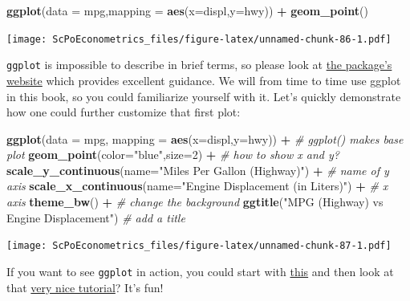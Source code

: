 \documentclass[]{book}
\newenvironment{Shaded}{\begin{snugshade}}{\end{snugshade}}
\newcommand{\KeywordTok}[1]{\textcolor[rgb]{0.13,0.29,0.53}{\textbf{#1}}}
\newcommand{\DataTypeTok}[1]{\textcolor[rgb]{0.13,0.29,0.53}{#1}}
\newcommand{\DecValTok}[1]{\textcolor[rgb]{0.00,0.00,0.81}{#1}}
\newcommand{\StringTok}[1]{\textcolor[rgb]{0.31,0.60,0.02}{#1}}
\newcommand{\CommentTok}[1]{\textcolor[rgb]{0.56,0.35,0.01}{\textit{#1}}}
\newcommand{\OperatorTok}[1]{\textcolor[rgb]{0.81,0.36,0.00}{\textbf{#1}}}
\newcommand{\NormalTok}[1]{#1}
\theoremstyle{definition}
\theoremstyle{definition}
\theoremstyle{definition}
\theoremstyle{remark}
\begin{document}
\begin{Shaded}
\begin{Highlighting}[]
\KeywordTok{ggplot}\NormalTok{(}\DataTypeTok{data =}\NormalTok{ mpg,}\DataTypeTok{mapping =} \KeywordTok{aes}\NormalTok{(}\DataTypeTok{x=}\NormalTok{displ,}\DataTypeTok{y=}\NormalTok{hwy)) }\OperatorTok{+}\StringTok{ }\KeywordTok{geom_point}\NormalTok{()}
\end{Highlighting}
\end{Shaded}

\texttt{[image: ScPoEconometrics\_files/figure-latex/unnamed-chunk-86-1.pdf]}

\texttt{ggplot} is impossible to describe in brief terms, so please look
at \href{http://ggplot2.tidyverse.org}{the package's website} which
provides excellent guidance. We will from time to time use ggplot in
this book, so you could familiarize yourself with it. Let's quickly
demonstrate how one could further customize that first plot:

\begin{Shaded}
\begin{Highlighting}[]
\KeywordTok{ggplot}\NormalTok{(}\DataTypeTok{data =}\NormalTok{ mpg, }\DataTypeTok{mapping =} \KeywordTok{aes}\NormalTok{(}\DataTypeTok{x=}\NormalTok{displ,}\DataTypeTok{y=}\NormalTok{hwy)) }\OperatorTok{+}\StringTok{   }\CommentTok{# ggplot() makes base plot}
\StringTok{  }\KeywordTok{geom_point}\NormalTok{(}\DataTypeTok{color=}\StringTok{"blue"}\NormalTok{,}\DataTypeTok{size=}\DecValTok{2}\NormalTok{) }\OperatorTok{+}\StringTok{     }\CommentTok{# how to show x and y?}
\StringTok{  }\KeywordTok{scale_y_continuous}\NormalTok{(}\DataTypeTok{name=}\StringTok{"Miles Per Gallon (Highway)"}\NormalTok{) }\OperatorTok{+}\StringTok{  }\CommentTok{# name of y axis}
\StringTok{  }\KeywordTok{scale_x_continuous}\NormalTok{(}\DataTypeTok{name=}\StringTok{"Engine Displacement (in Liters)"}\NormalTok{) }\OperatorTok{+}\StringTok{ }\CommentTok{# x axis}
\StringTok{  }\KeywordTok{theme_bw}\NormalTok{() }\OperatorTok{+}\StringTok{    }\CommentTok{# change the background}
\StringTok{  }\KeywordTok{ggtitle}\NormalTok{(}\StringTok{"MPG (Highway) vs Engine Displacement"}\NormalTok{)   }\CommentTok{# add a title}
\end{Highlighting}
\end{Shaded}

\texttt{[image: ScPoEconometrics\_files/figure-latex/unnamed-chunk-87-1.pdf]}

If you want to see \texttt{ggplot} in action, you could start with
\href{http://jcyhong.github.io/ggplot_demo.html}{this} and then look at
that
\href{https://tutorials.iq.harvard.edu/R/Rgraphics/Rgraphics.html}{very
nice tutorial}? It's fun!
\end{document}
